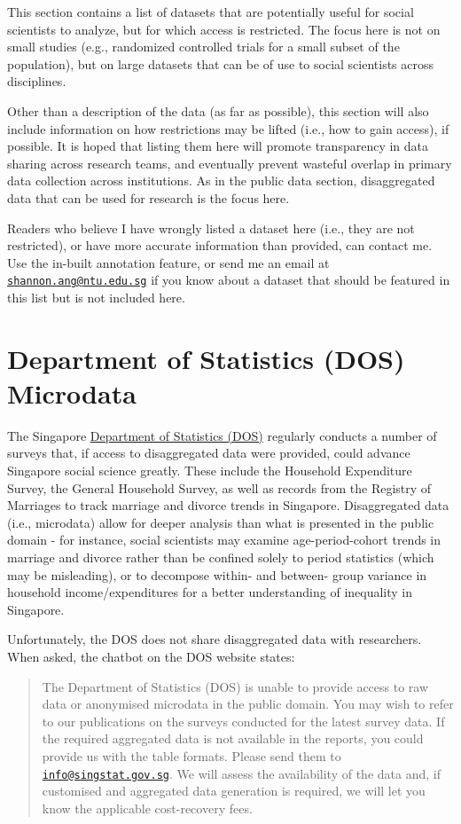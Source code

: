 \documentclass[openany]{book}
\begin{document}
This section contains a list of datasets that are potentially useful for
social scientists to analyze, but for which access is restricted. The
focus here is not on small studies (e.g., randomized controlled trials
for a small subset of the population), but on large datasets that can be
of use to social scientists across disciplines.

Other than a description of the data (as far as possible), this section
will also include information on how restrictions may be lifted (i.e.,
how to gain access), if possible. It is hoped that listing them here
will promote transparency in data sharing across research teams, and
eventually prevent wasteful overlap in primary data collection across
institutions. As in the public data section, disaggregated data that can
be used for research is the focus here.

Readers who believe I have wrongly listed a dataset here (i.e., they are
not restricted), or have more accurate information than provided, can
contact me. Use the in-built annotation feature, or send me an email at
\href{mailto:shannon.ang@ntu.edu.sg}{\nolinkurl{shannon.ang@ntu.edu.sg}}
if you know about a dataset that should be featured in this list but is
not included here.

\section{Department of Statistics (DOS) Microdata}\label{dos}

The Singapore \href{https://www.singstat.gov.sg}{Department of
Statistics (DOS)} regularly conducts a number of surveys that, if access
to disaggregated data were provided, could advance Singapore social
science greatly. These include the Household Expenditure Survey, the
General Household Survey, as well as records from the Registry of
Marriages to track marriage and divorce trends in Singapore.
Disaggregated data (i.e., microdata) allow for deeper analysis than what
is presented in the public domain - for instance, social scientists may
examine age-period-cohort trends in marriage and divorce rather than be
confined solely to period statistics (which may be misleading), or to
decompose within- and between- group variance in household
income/expenditures for a better understanding of inequality in
Singapore.

Unfortunately, the DOS does not share disaggregated data with
researchers. When asked, the chatbot on the DOS website states:

\begin{quote}
The Department of Statistics (DOS) is unable to provide access to raw
data or anonymised microdata in the public domain. You may wish to refer
to our publications on the surveys conducted for the latest survey data.
If the required aggregated data is not available in the reports, you
could provide us with the table formats. Please send them to
\href{mailto:info@singstat.gov.sg}{\nolinkurl{info@singstat.gov.sg}}. We
will assess the availability of the data and, if customised and
aggregated data generation is required, we will let you know the
applicable cost-recovery fees.
\end{quote}
\end{document}
